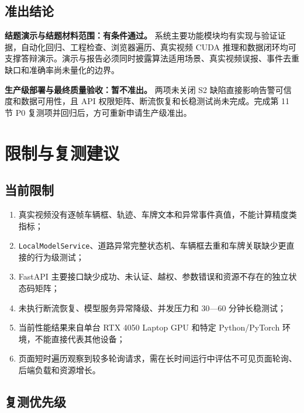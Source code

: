 \subsection{准出结论}\label{test-ux51c6ux51faux7ed3ux8bba}

\textbf{结题演示与结题材料范围：有条件通过。} 系统主要功能模块均有实现与验证证据，自动化回归、工程检查、浏览器遍历、真实视频 CUDA 推理和数据闭环均可支撑答辩演示。演示与报告必须同时披露算法适用场景、真实视频误报、事件去重缺口和准确率尚未量化的边界。

\textbf{生产级部署与最终质量验收：暂不准出。} 两项未关闭 S2 缺陷直接影响告警可信度和数据可用性，且 API 权限矩阵、断流恢复和长稳测试尚未完成。完成第 11 节 P0 复测项并回归后，方可重新申请生产级准出。

\section{限制与复测建议}\label{test-ux9650ux5236ux4e0eux590dux6d4bux5efaux8bae}

\subsection{当前限制}\label{test-ux5f53ux524dux9650ux5236}

\begin{enumerate}
\def\labelenumi{\arabic{enumi}.}
\tightlist
\item
  真实视频没有逐帧车辆框、轨迹、车牌文本和异常事件真值，不能计算精度类指标；
\item
  \texttt{Local\allowbreak{}Model\allowbreak{}Service}、道路异常完整状态机、车辆框去重和车牌关联缺少更直接的行为级测试；
\item
  FastAPI 主要接口缺少成功、未认证、越权、参数错误和资源不存在的独立状态码矩阵；
\item
  未执行断流恢复、模型服务异常降级、并发压力和 30---60 分钟长稳测试；
\item
  当前性能结果来自单台 RTX 4050 Laptop GPU 和特定 Python/PyTorch 环境，不能直接代表其他设备；
\item
  页面短时遍历观察到较多轮询请求，需在长时间运行中评估不可见页面轮询、后端负载和资源增长。
\end{enumerate}

\subsection{复测优先级}\label{test-ux590dux6d4bux4f18ux5148ux7ea7}

